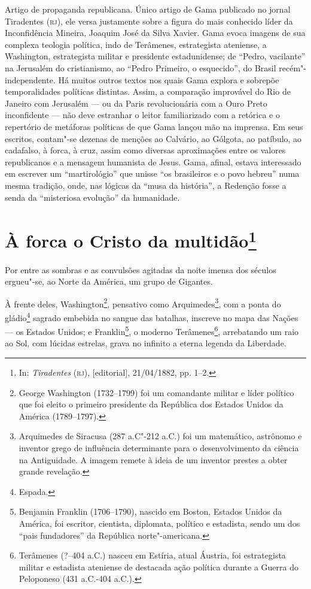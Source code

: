 {\small\noindent
Artigo de propaganda republicana. Único artigo de Gama publicado
no jornal Tiradentes (\textsc{rj}), ele versa justamente sobre a figura do mais
conhecido líder da Inconfidência Mineira, Joaquim José da Silva Xavier.
Gama evoca imagens de sua complexa teologia política,
indo de Terâmenes, estrategista ateniense, a
Washington, estrategista militar e presidente estadunidense; de ``Pedro,
vacilante'' na Jerusalém do cristianismo, ao ``Pedro Primeiro, o
esquecido'', do Brasil recém"-independente. Há muitos outros textos nos
quais Gama explora e sobrepõe temporalidades políticas
distintas. Assim, a comparação improvável do Rio de Janeiro com
Jerusalém --- ou da Paris revolucionária com a Ouro
Preto inconfidente --- não deve estranhar o leitor familiarizado com a
retórica e o repertório de metáforas políticas de que Gama lançou mão
na imprensa. Em seus escritos, contam"-se dezenas de
menções ao Calvário, ao Gólgota, ao patíbulo, ao cadafalso, à forca, à
cruz, assim como diversas aproximações entre os valores republicanos e a
mensagem humanista de Jesus. Gama, afinal, estava interessado em
escrever um ``martirológio'' que unisse ``os brasileiros e o povo hebreu''
numa mesma tradição, onde, nas lógicas da ``musa da história'', a Redenção
fosse a senda da ``misteriosa evolução'' da humanidade. }

\chapter{À forca o Cristo da multidão\footnote[*]{In:
  \emph{Tiradentes} (\textsc{rj}), {[}editorial{]}, 21/04/1882, pp. 1--2.}}

Por entre as sombras e as convulsões agitadas da noite imensa dos
séculos ergueu"-se, ao Norte da América, um grupo de Gigantes.

À frente deles, Washington\footnote{George Washington (1732--1799) foi
  um comandante militar e líder político que foi eleito o primeiro
  presidente da República dos Estados Unidos da América (1789--1797).},
pensativo como Arquimedes\footnote{Arquimedes de Siracusa (287 a.C"-212
  a.C.) foi um matemático, astrônomo e inventor grego de influência
  determinante para o desenvolvimento da ciência na Antiguidade. A
  imagem remete à ideia de um inventor prestes a obter grande revelação.},
com a ponta do gládio\footnote{Espada.} sagrado embebida no sangue das
batalhas, inscreve no mapa das Nações --- os Estados Unidos; e
Franklin\footnote{Benjamin Franklin (1706--1790), nascido em Boston,
  Estados Unidos da América, foi escritor, cientista, diplomata,
  político e estadista, sendo um dos ``pais fundadores'' da República
  norte"-americana.}, o moderno Terâmenes\footnote{Terâmenes (?--404
  a.C.) nasceu em Estíria, atual Áustria, foi estrategista militar e
  estadista ateniense de destacada ação política durante a Guerra do
  Peloponeso (431 a.C.-404 a.C.).}, arrebatando um raio ao Sol, com
lúcidas estrelas, grava no infinito a eterna legenda da Liberdade.

